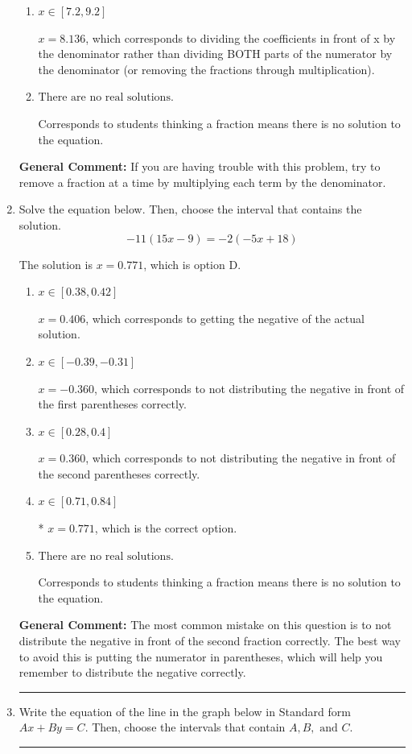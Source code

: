 \documentclass{extbook}[14pt]
\newcommand{\litem}[1]{\item #1

\rule{\textwidth}{0.4pt}}
\begin{document}
\begin{enumerate}
{\begin{enumerate}[label=\Alph*.]
 $x = -0.712$, which corresponds to not distributing the negative in front of the second fraction.
\item \( x \in [7.2, 9.2] \)

 $x = 8.136$, which corresponds to dividing the coefficients in front of x by the denominator rather than dividing BOTH parts of the numerator by the denominator (or removing the fractions through multiplication).
\item \( \text{There are no real solutions.} \)

Corresponds to students thinking a fraction means there is no solution to the equation.
\end{enumerate}

\textbf{General Comment:} If you are having trouble with this problem, try to remove a fraction at a time by multiplying each term by the denominator.
}
\litem{
Solve the equation below. Then, choose the interval that contains the solution.
\[ -11(15x -9) = -2(-5x + 18) \]

The solution is \( x = 0.771 \), which is option D.\begin{enumerate}[label=\Alph*.]
\item \( x \in [0.38, 0.42] \)

$x = 0.406$, which corresponds to getting the negative of the actual solution.
\item \( x \in [-0.39, -0.31] \)

$x = -0.360$, which corresponds to not distributing the negative in front of the first parentheses correctly.
\item \( x \in [0.28, 0.4] \)

$x = 0.360$, which corresponds to not distributing the negative in front of the second parentheses correctly.
\item \( x \in [0.71, 0.84] \)

* $x = 0.771$, which is the correct option.
\item \( \text{There are no real solutions.} \)

Corresponds to students thinking a fraction means there is no solution to the equation.
\end{enumerate}

\textbf{General Comment:} The most common mistake on this question is to not distribute the negative in front of the second fraction correctly. The best way to avoid this is putting the numerator in parentheses, which will help you remember to distribute the negative correctly.
}
\litem{
Write the equation of the line in the graph below in Standard form $Ax+By=C$. Then, choose the intervals that contain $A, B, \text{ and } C$.

}
\end{enumerate}
\end{document}
